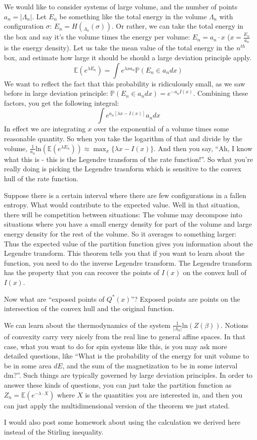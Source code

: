 We would like to consider systems of large volume, and the number of points $a_n = |\Lambda_n|$. Let $E_n$ be something like the total energy in the volume $\Lambda_n$ with configuration $\sigma$: $E_n = H(_{\Lambda_n}(\sigma))$. Or rather, we can take the total energy in the box and say it's the volume times the energy per volume: $E_n = a_n \cdot x$ ($x = \frac{E_n}{a_n}$ is the energy density). Let us take the mean value of the total energy in the $n^{th}$ box, and estimate how large it should be should a large deviation principle apply. 
\[
\mathbb{E} \left(e^{\lambda E_n}\right) = \int e^{\lambda x a_n} \mathbb{P}(E_n \in a_n dx)
\] 
We want to reflect the fact that this probability is ridiculously small, as we saw before in large deviation principle: $\mathbb{P}(E_n \in a_ndx) = e^{-a_nI(x)}$. Combining these factors, you get the following integral: 
\[
\int e^{a_n\left[ \lambda x - I(x)\right]}a_n dx
\]
In effect we are integrating $x$ over the exponential of a volume times some reasonable quantity. So when you take the logarithm of that and divide by the volume, $\frac{1}{a_n}\text{ln}(\mathbb{E}(e^{\lambda E_n})) \approx \max_x \{\lambda x - I(x)\}$. And then you say, ``Ah, I know what this is - this is the Legendre transform of the rate function!''. So what you're really doing is picking the Legendre trasnform which is sensitive to the convex hull of the rate function. 

Suppose there is a certain interval where there are few configurations in a fallen entropy. What would contribute to the expected value. Well in that situation, there will be competition between situations: The volume may decompose into situations where you have a small energy density for part of the volume and large energy density for the rest of the volume. So it averages to something larger: Thus the expected value of the partition function gives you information about the Legendre transform. This theorem tells you that if you want to learn about the function, you need to do the inverse Legendre transform. The Legendre transform has the property that you can recover the points of $I(x)$ on the convex hull of $I(x)$. 

Now what are ``exposed points of $Q^*(x)$''? Exposed points are points on the intersection of the convex hull and the original function. 

We can learn about the thermodynamics of the system $\frac{1}{|\Lambda_n|}\text{ln}(Z(\beta))$. Notions of convexity carry very nicely from the real line to general affine spaces. In that case, what you want to do for spin systems like this, is you may ask more detailed questions, like ``What is the probability of the energy for unit volume to be in some area $dE$, and the sum of the magnetization to be in some interval dm?''. Such things are typically governed by large deviation principles. 
In order to answer these kinds of questions, you can just take the partition function as $Z_n = \mathbb{E}(e^{-\lambda \cdot X})$ where $X$ is the quantities you are interested in, and then you can just apply the multidimensional version of the theorem we just stated. 

I would also post some homework about using the calculation we derived here instead of the Stirling inequality. 



